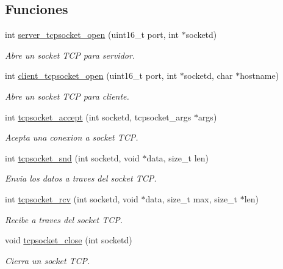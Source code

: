 \subsection*{Funciones}
\begin{DoxyCompactItemize}
\item 
int \hyperlink{G-2301-01-P1-tcp_8c_a61264c8cd27594410ae2dfb47636f0df}{server\+\_\+tcpsocket\+\_\+open} (uint16\+\_\+t port, int $\ast$socketd)
\begin{DoxyCompactList}\small\item\em Abre un socket T\+C\+P para servidor. \end{DoxyCompactList}\item 
int \hyperlink{G-2301-01-P1-tcp_8c_a165425a589b956da5b412cd800b9fdd0}{client\+\_\+tcpsocket\+\_\+open} (uint16\+\_\+t port, int $\ast$socketd, char $\ast$hostname)
\begin{DoxyCompactList}\small\item\em Abre un socket T\+C\+P para cliente. \end{DoxyCompactList}\item 
int \hyperlink{G-2301-01-P1-tcp_8c_ad4435ff2d726b9709f16cd83b422a2af}{tcpsocket\+\_\+accept} (int socketd, tcpsocket\+\_\+args $\ast$args)
\begin{DoxyCompactList}\small\item\em Acepta una conexion a socket T\+C\+P. \end{DoxyCompactList}\item 
int \hyperlink{G-2301-01-P1-tcp_8c_a2679468c1d7867805267820ef3fcc768}{tcpsocket\+\_\+snd} (int socketd, void $\ast$data, size\+\_\+t len)
\begin{DoxyCompactList}\small\item\em Envia los datos a traves del socket T\+C\+P. \end{DoxyCompactList}\item 
int \hyperlink{G-2301-01-P1-tcp_8c_aa05a2884a00c4137853da3543673a75c}{tcpsocket\+\_\+rcv} (int socketd, void $\ast$data, size\+\_\+t max, size\+\_\+t $\ast$len)
\begin{DoxyCompactList}\small\item\em Recibe a traves del socket T\+C\+P. \end{DoxyCompactList}\item 
void \hyperlink{G-2301-01-P1-tcp_8c_a167d4c9cfbe1179c55caa9ef515ef288}{tcpsocket\+\_\+close} (int socketd)
\begin{DoxyCompactList}\small\item\em Cierra un socket T\+C\+P. \end{DoxyCompactList}\end{DoxyCompactItemize}


